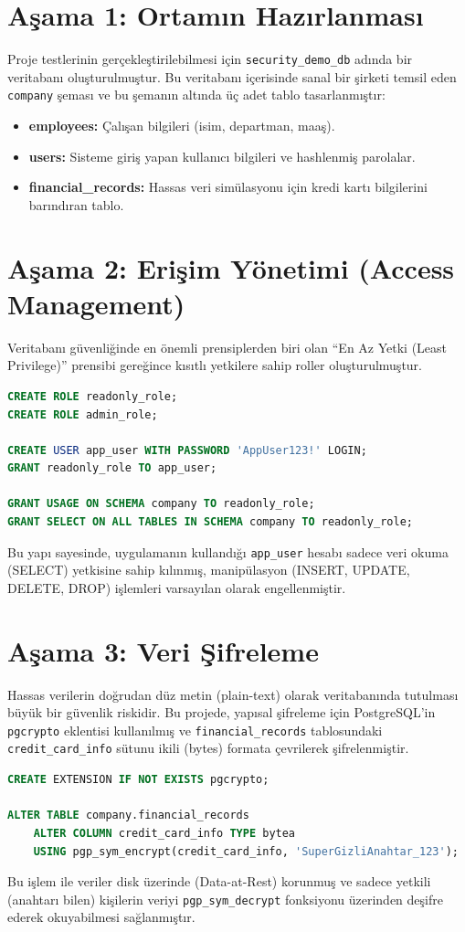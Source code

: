 \documentclass[12pt,a4paper]{article}
\begin{document}
\section{Aşama 1: Ortamın Hazırlanması}
Proje testlerinin gerçekleştirilebilmesi için \texttt{security\_demo\_db} adında bir veritabanı oluşturulmuştur. Bu veritabanı içerisinde sanal bir şirketi temsil eden \texttt{company} şeması ve bu şemanın altında üç adet tablo tasarlanmıştır:
\begin{itemize}
    \item \textbf{employees:} Çalışan bilgileri (isim, departman, maaş).
    \item \textbf{users:} Sisteme giriş yapan kullanıcı bilgileri ve hashlenmiş parolalar.
    \item \textbf{financial\_records:} Hassas veri simülasyonu için kredi kartı bilgilerini barındıran tablo.
\end{itemize}

\section{Aşama 2: Erişim Yönetimi (Access Management)}
Veritabanı güvenliğinde en önemli prensiplerden biri olan ``En Az Yetki (Least Privilege)'' prensibi gereğince kısıtlı yetkilere sahip roller oluşturulmuştur.
\begin{lstlisting}[language=SQL, caption=Rol ve Kullanıcı Oluşturma]
CREATE ROLE readonly_role;
CREATE ROLE admin_role;

CREATE USER app_user WITH PASSWORD 'AppUser123!' LOGIN;
GRANT readonly_role TO app_user;

GRANT USAGE ON SCHEMA company TO readonly_role;
GRANT SELECT ON ALL TABLES IN SCHEMA company TO readonly_role;
\end{lstlisting}
Bu yapı sayesinde, uygulamanın kullandığı \texttt{app\_user} hesabı sadece veri okuma (SELECT) yetkisine sahip kılınmış, manipülasyon (INSERT, UPDATE, DELETE, DROP) işlemleri varsayılan olarak engellenmiştir.

\section{Aşama 3: Veri Şifreleme}
Hassas verilerin doğrudan düz metin (plain-text) olarak veritabanında tutulması büyük bir güvenlik riskidir. Bu projede, yapısal şifreleme için PostgreSQL'in \texttt{pgcrypto} eklentisi kullanılmış ve \texttt{financial\_records} tablosundaki \texttt{credit\_card\_info} sütunu ikili (bytes) formata çevrilerek şifrelenmiştir.
\begin{lstlisting}[language=SQL, caption=pgcrypto ile Veri Şifreleme]
CREATE EXTENSION IF NOT EXISTS pgcrypto;

ALTER TABLE company.financial_records
    ALTER COLUMN credit_card_info TYPE bytea 
    USING pgp_sym_encrypt(credit_card_info, 'SuperGizliAnahtar_123');
\end{lstlisting}
Bu işlem ile veriler disk üzerinde (Data-at-Rest) korunmuş ve sadece yetkili (anahtarı bilen) kişilerin veriyi \texttt{pgp\_sym\_decrypt} fonksiyonu üzerinden deşifre ederek okuyabilmesi sağlanmıştır.
\end{document}
